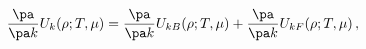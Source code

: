 \begin{equation}
  \frac{\pa }{\pa k}U_k(\rho;T,\mu)=\frac{\pa }{\pa k}U_{kB}(\rho;T,\mu)
  +\frac{\pa }{\pa k}U_{kF}(\rho;T,\mu) \label{dtu} \, ,
\end{equation}

